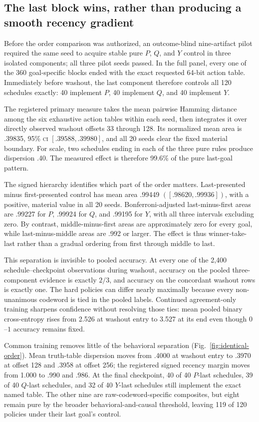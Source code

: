 \documentclass[11pt,a4paper]{article}
\newcommand{\CI}{\textsc{ci}}
\newcommand{\fig}[1]{Fig.~\ref{#1}}
\begin{document}
\subsection*{The last block wins, rather than producing a smooth recency gradient}

Before the order comparison was authorized, an outcome-blind nine-artifact pilot required the same seed to acquire stable pure $P$, $Q$, and $Y$ control in three isolated components; all three pilot seeds passed. In the full panel, every one of the 360 goal-specific blocks ended with the exact requested 64-bit action table. Immediately before washout, the last component therefore controls all 120 schedules exactly: 40 implement $P$, 40 implement $Q$, and 40 implement $Y$.

The registered primary measure takes the mean pairwise Hamming distance among the six exhaustive action tables within each seed, then integrates it over directly observed washout offsets 33 through 128. Its normalized mean area is .39835, 95\% \CI{} $[.39588,.39980]$, and all 20 seeds clear the fixed material boundary. For scale, two schedules ending in each of the three pure rules produce dispersion .40. The measured effect is therefore 99.6\% of the pure last-goal pattern.

The signed hierarchy identifies which part of the order matters. Last-presented minus first-presented control has mean area .99449 $([.98620,.99936])$, with a positive, material value in all 20 seeds. Bonferroni-adjusted last-minus-first areas are .99227 for $P$, .99924 for $Q$, and .99195 for $Y$, with all three intervals excluding zero. By contrast, middle-minus-first areas are approximately zero for every goal, while last-minus-middle areas are .992 or larger. The effect is thus winner-take-last rather than a gradual ordering from first through middle to last.

This separation is invisible to pooled accuracy. At every one of the 2,400 schedule--checkpoint observations during washout, accuracy on the pooled three-component evidence is exactly $2/3$, and accuracy on the concordant washout rows is exactly one. The hard policies can differ nearly maximally because every non-unanimous codeword is tied in the pooled labels. Continued agreement-only training sharpens confidence without resolving those ties: mean pooled binary cross-entropy rises from 2.526 at washout entry to 3.527 at its end even though $0$--$1$ accuracy remains fixed.

Common training removes little of the behavioral separation (\fig{fig:identical-order}). Mean truth-table dispersion moves from .4000 at washout entry to .3970 at offset 128 and .3958 at offset 256; the registered signed recency margin moves from 1.000 to .990 and .986. At the final checkpoint, 40 of 40 $P$-last schedules, 39 of 40 $Q$-last schedules, and 32 of 40 $Y$-last schedules still implement the exact named table. The other nine are raw-codeword-specific composites, but eight remain pure by the broader behavioral-and-causal threshold, leaving 119 of 120 policies under their last goal's control.
\end{document}
